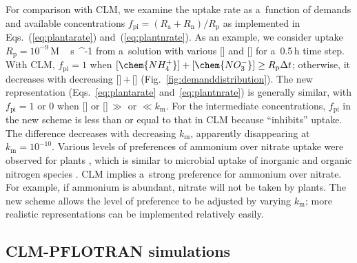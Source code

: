 \documentclass[gmdd, online, hvmath]{copernicus}
\begin{document}
      For comparison with CLM, we examine the uptake rate as a~function of
      demands and available concentrations $f_{\text{pi}} = ({R_\mathrm{a} +
      R_\mathrm{n}})/{R_\mathrm{p}}$ as implemented in
      Eqs.~(\ref{eq:plantarate}) and~(\ref{eq:plantnrate}).  As an example,
      we consider uptake $R_\mathrm{p}=10^{-9}$\,\unit{M\,s{^{-1}}} from
      a~solution with various [] and [] for
      a~0.5\,h time step. With CLM, $f_{\text{pi}}=1$ when
      $[\chem{NH_4^+}]+[\chem{NO_3^-}]\geq R_\mathrm{p}\Delta t$; otherwise,
      it decreases with decreasing []\,$+$\,[]
      (Fig.~\ref{fig:demanddistribution}). The new representation
      (Eqs.~\ref{eq:plantarate} and~\ref{eq:plantnrate}) is generally
      similar, with $f_{\text{pi}}=1$ or 0 when [] or
      []\,$\gg$ or $\ll k_\mathrm{m}$. For the intermediate
      concentrations, $f_{\text{pi}}$ in the new scheme is less than or
      equal to that in CLM because  ``inhibits'' 
      uptake. The difference decreases with decreasing $k_\mathrm{m}$,
      apparently disappearing at $k_\mathrm{m} = 10^{-10}$. Various levels
      of preferences of ammonium over nitrate uptake were observed for
      plants
      \citep{Pfautsch2009,Warren2007,Nordin2001,Falkengren1995,Gherardi2013},
      which is similar to microbial uptake of inorganic and organic nitrogen
      species
      \citep{Fouilland2007,Kirchman1994,Kirchman1998,Middelburg2000,Veuger2004}. CLM
      implies a~strong preference for ammonium over nitrate. For example, if
      ammonium is abundant, nitrate will not be taken by plants. The new
      scheme allows the level of preference to be adjusted by varying
      $k_\mathrm{m}$; more realistic representations can be implemented
      relatively easily.



\subsection{CLM-PFLOTRAN simulations}%
\end{document}

